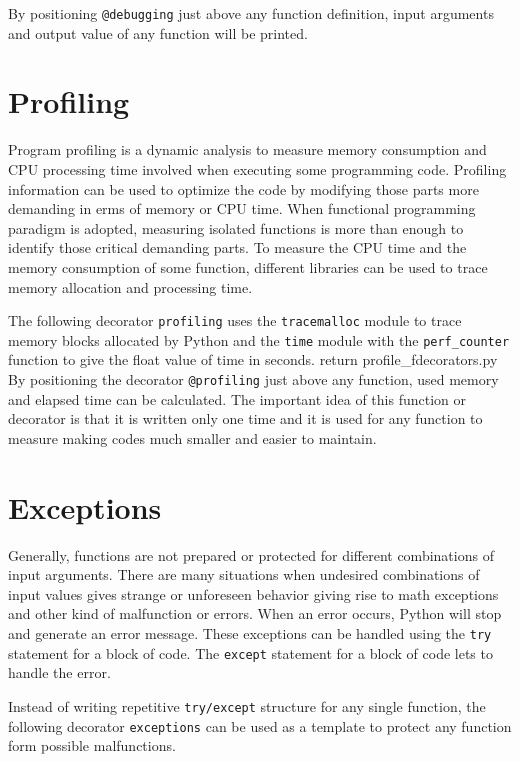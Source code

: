 By positioning \verb|@debugging| just above any function definition, input arguments
and output value of any function will be printed.  



\newpage 
\section{Profiling} 
Program profiling is a dynamic analysis to measure memory consumption and CPU processing time 
involved when executing some programming code. 
Profiling information can be used to optimize the code by modifying those parts more 
demanding in erms of memory or CPU time. 
When functional programming paradigm is adopted, measuring isolated functions is more than enough 
to identify those critical demanding parts. 
To measure the CPU time and the memory consumption of some function, 
different libraries can be used to trace memory allocation and processing time. 

The following decorator \verb|profiling|  uses the \verb|tracemalloc| module  to trace memory blocks allocated by Python
and the \verb|time| module with the \verb|perf_counter| 
function to give  the float value of time in seconds. 
\vspace{0.5cm}
  {return profile_f}{decorators.py}
By positioning the decorator \verb|@profiling| just above any function, used memory and 
elapsed time can be calculated.
The important idea of this function or decorator is that it is written only one time 
and it is used for any function to measure making codes much smaller and easier to maintain.


\newpage
\section{Exceptions}
Generally, functions are not prepared or protected for different combinations of input 
arguments. There are many situations when undesired combinations of input values gives 
strange or unforeseen behavior giving rise to math exceptions and other kind of 
malfunction or errors. When an error occurs, 
Python will stop and generate an error message.
These exceptions can be handled using the \verb|try| statement for a block of code. 
The \verb|except| statement for a block of code lets to handle the error.


Instead of writing  repetitive \verb|try/except| structure for any single function, the following 
decorator \verb|exceptions| can be used as a template 
to protect any function form possible malfunctions. 

